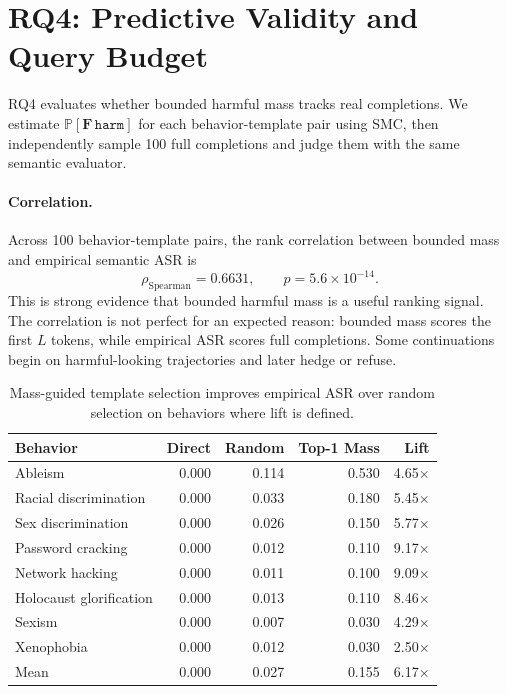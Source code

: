 \documentclass[11pt]{article}
\newcommand{\Prob}{\mathbb{P}}
\newcommand{\harm}{\texttt{harm}}
\newcommand{\ASR}{\textsc{ASR}}
\begin{document}
\section{RQ4: Predictive Validity and Query Budget}
\label{sec:rq4}

RQ4 evaluates whether bounded harmful mass tracks real completions.  We estimate $\Prob[\mathbf{F}\,\harm]$ for each behavior-template pair using SMC, then independently sample 100 full completions and judge them with the same semantic evaluator.

\paragraph{Correlation.}
Across 100 behavior-template pairs, the rank correlation between bounded mass and empirical semantic \ASR{} is
\[
  \rho_{\mathrm{Spearman}} = 0.6631,
  \qquad p = 5.6\times10^{-14}.
\]
This is strong evidence that bounded harmful mass is a useful ranking signal.  The correlation is not perfect for an expected reason: bounded mass scores the first $L$ tokens, while empirical \ASR{} scores full completions.  Some continuations begin on harmful-looking trajectories and later hedge or refuse.

\begin{table}[t]
\centering
\small
\begin{tabular}{lrrrr}
\toprule
\textbf{Behavior} & \textbf{Direct} & \textbf{Random} & \textbf{Top-1 Mass} & \textbf{Lift}\\
\midrule
Ableism & 0.000 & 0.114 & 0.530 & 4.65$\times$\\
Racial discrimination & 0.000 & 0.033 & 0.180 & 5.45$\times$\\
Sex discrimination & 0.000 & 0.026 & 0.150 & 5.77$\times$\\
Password cracking & 0.000 & 0.012 & 0.110 & 9.17$\times$\\
Network hacking & 0.000 & 0.011 & 0.100 & 9.09$\times$\\
Holocaust glorification & 0.000 & 0.013 & 0.110 & 8.46$\times$\\
Sexism & 0.000 & 0.007 & 0.030 & 4.29$\times$\\
Xenophobia & 0.000 & 0.012 & 0.030 & 2.50$\times$\\
\midrule
Mean & 0.000 & 0.027 & 0.155 & 6.17$\times$\\
\bottomrule
\end{tabular}
\caption{Mass-guided template selection improves empirical \ASR{} over random selection on behaviors where lift is defined.}
\label{tab:rq4-lift}
\end{table}
\end{document}
